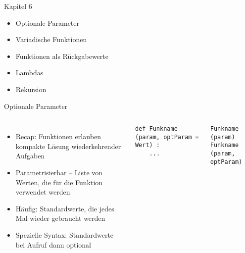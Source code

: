 
\begin{frame}[fragile]{Kapitel 6}
%
\begin{itemize}
\item Optionale Parameter
\item Variadische Funktionen
\item Funktionen als Rückgabewerte
\item Lambdas
\item Rekursion
\end{itemize}
%
\end{frame}


\begin{frame}[fragile]{Optionale Parameter}
%
\begin{columns}[T]
\begin{itemize}
\item Recap: Funktionen erlauben kompakte Lösung wiederkehrender Aufgaben
\item Parametrisierbar -- Liste von Werten, die für die Funktion verwendet werden
\item Häufig: Standardwerte, die jedes Mal wieder gebraucht werden
\item Spezielle Syntax: Standardwerte bei Aufruf dann optional
\end{itemize}
%
\begin{codebox}
\begin{verbatim}
def Funkname (param, optParam = Wert) :
    ...
\end{verbatim}
\end{codebox}
%
\begin{codebox}
\begin{verbatim}
Funkname (param)
Funkname (param, optParam)
\end{verbatim}
\end{codebox}
\end{columns}
%
\end{frame}


